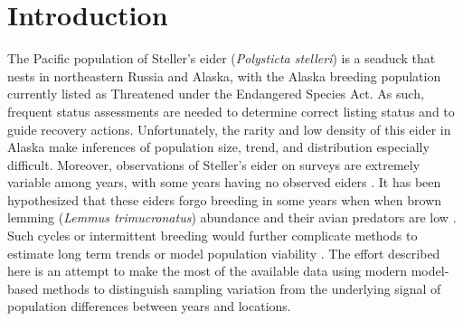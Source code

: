 \documentclass[
  10pt,
  letterpaper,
]{article}
\begin{document}
\linenumbers

\section{Introduction}\label{introduction}

The Pacific population of Steller's eider (\emph{Polysticta stelleri})
is a seaduck that nests in northeastern Russia and Alaska, with the
Alaska breeding population currently listed as Threatened under the
Endangered Species Act. As such, frequent status assessments are needed
to determine correct listing status and to guide recovery actions.
Unfortunately, the rarity and low density of this eider in Alaska make
inferences of population size, trend, and distribution especially
difficult. Moreover, observations of Steller's eider on surveys are
extremely variable among years, with some years having no observed
eiders \citep{obritschkewitsch2008steller} \citep{wilson2025population}.
It has been hypothesized that these eiders forgo breeding in some years
when when brown lemming (\emph{Lemmus trimucronatus}) abundance and
their avian predators are low \citep{quakenbush2004breeding}. Such
cycles or intermittent breeding would further complicate methods to
estimate long term trends or model population viability
\citep{dunham2017evaluating}. The effort described here is an attempt to
make the most of the available data using modern model-based methods to
distinguish sampling variation from the underlying signal of population
differences between years and locations.
\end{document}
